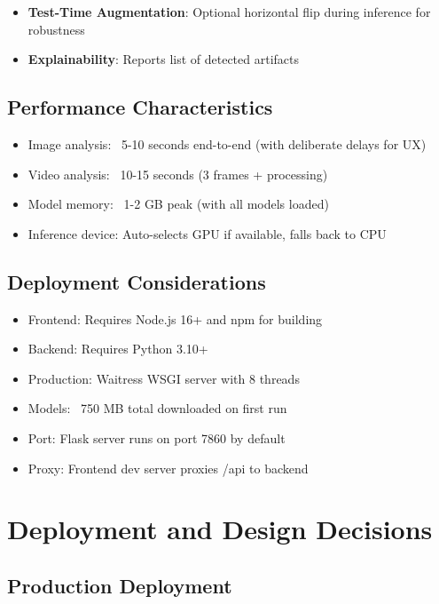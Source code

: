 \documentclass[12pt,a4paper]{book}
\begin{document}
\begin{itemize}
\begin{itemize}
    \item \textbf{Test-Time Augmentation}: Optional horizontal flip during inference for robustness
    
    \item \textbf{Explainability}: Reports list of detected artifacts
\end{itemize}

\section{Performance Characteristics}

\begin{itemize}
    \item Image analysis: ~5-10 seconds end-to-end (with deliberate delays for UX)
    \item Video analysis: ~10-15 seconds (3 frames + processing)
    \item Model memory: ~1-2 GB peak (with all models loaded)
    \item Inference device: Auto-selects GPU if available, falls back to CPU
\end{itemize}

\section{Deployment Considerations}

\begin{itemize}
    \item Frontend: Requires Node.js 16+ and npm for building
    \item Backend: Requires Python 3.10+
    \item Production: Waitress WSGI server with 8 threads
    \item Models: ~750 MB total downloaded on first run
    \item Port: Flask server runs on port 7860 by default
    \item Proxy: Frontend dev server proxies /api to backend
\end{itemize}

\chapter{Deployment and Design Decisions}
\label{ch:deployment}

\section{Production Deployment}


\end{itemize}
\end{document}
